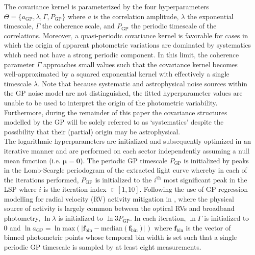 \noindent The covariance kernel is parameterized by the four hyperparameters
$\Theta=\{a_{\text{GP}},\lambda,\Gamma,P_{\text{GP}}\}$ where
$a$ is the correlation amplitude, $\lambda$ the exponential timescale, $\Gamma$ the coherence scale,
and $P_{\text{GP}}$ the periodic timescale of the correlations. Moreover,
a quasi-periodic covariance kernel is favorable for cases in which the origin of
apparent photometric variations are dominated by systematics which need not have a strong periodic
component. In this limit, the coherence parameter $\Gamma$ approaches small values such
that the covariance kernel becomes well-approximated by a squared exponential kernel with effectively a
single timescale $\lambda$. Note that because 
systematic and astrophysical noise sources within the GP noise model are not distinguished,
the fitted hyperparameter values are unable to be used to interpret the origin of the photometric
variability. Furthermore, during the remainder of this paper the covariance structures modelled by the
GP will be solely referred to as `systematics' despite the possibility that their (partial) origin may
be astrophysical. \\

The logarithmic hyperparameters are initialized and subsequently optimized in an iterative manner and
are performed on each \tess{} sector independently assuming a null mean function (i.e.
$\boldsymbol{\mu}=\mathbf{0}$).
The periodic GP timescale $P_{\text{GP}}$ is initialized by peaks in the Lomb-Scargle
periodogram \citep[LSP;][]{scargle82} of the extracted light curve whereby in each of the iterations
performed, $P_{\text{GP}}$ is initialized to the $i^{\text{th}}$ most significant peak in the LSP where $i$
is the iteration index $\in [1,10]$.
Following the use of GP regression
modelling for radial velocity (RV) activity mitigation in \cite{dittmann17a}, where the physical source of
activity is largely common between the optical RVs and broadband \tess{} photometry,  
$\ln{\lambda}$ is initialized to $\ln{3P_{\text{GP}}}$. In each iteration, $\ln{\Gamma}$ is initialized to
$0$ and $\ln{a_{\text{GP}}}=\ln{\text{max}(|\mathbf{f}_{\text{bin}} - \text{median}(\mathbf{f}_{\text{bin}})|)}$
where $\mathbf{f}_{\text{bin}}$ is the vector of binned photometric points whose temporal bin width is set
such that a single periodic GP timescale is sampled by at least eight measurements. \\

